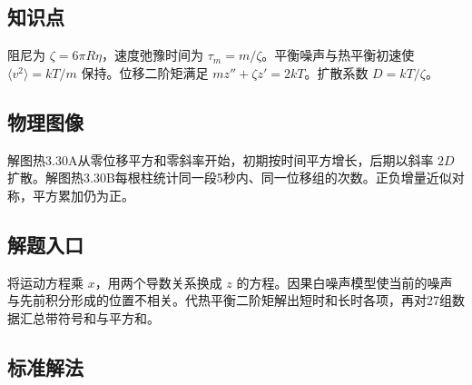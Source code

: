 \documentclass[UTF8,fontset=fandol,a4paper,11pt]{ctexart}
\begin{document}

\subsection*{知识点}

阻尼为 $\zeta=6\pi R\eta$，速度弛豫时间为 $\tau_m=m/\zeta$。平衡噪声与热平衡初速使 $\langle v^2\rangle=kT/m$ 保持。位移二阶矩满足 $mz''+\zeta z'=2kT$。扩散系数 $D=kT/\zeta$。




\subsection*{物理图像}

解图热3.30A从零位移平方和零斜率开始，初期按时间平方增长，后期以斜率 $2D$ 扩散。解图热3.30B每根柱统计同一段5秒内、同一位移组的次数。正负增量近似对称，平方累加仍为正。



\subsection*{解题入口}

将运动方程乘 $x$，用两个导数关系换成 $z$ 的方程。因果白噪声模型使当前的噪声与先前积分形成的位置不相关。代热平衡二阶矩解出短时和长时各项，再对27组数据汇总带符号和与平方和。




\subsection*{标准解法}
\end{document}
